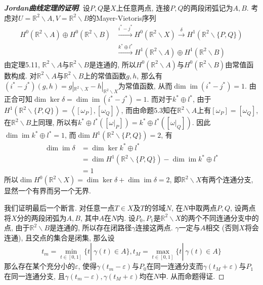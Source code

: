 \documentclass[11pt]{article}
\theoremstyle{definition}\newtheorem*{analyse}{分析}
\theoremstyle{remark}\newtheorem{rem*}{评注}
\DeclareMathOperator{\im}{im}
\begin{document}
\begin{proof}[{\bf Jordan曲线定理的证明}]
    设$P,Q$是$X$上任意两点, 连接$P,Q$的两段闭弧记为$A,B$.
    考虑对$U=\mathbb{R}^2\backslash A,V=\mathbb{R}^2\backslash B$的Mayer-Vietoris序列
    \begin{align*}
        H^0(\mathbb{R}^2\backslash A)\oplus H^0(\mathbb{R}^2\backslash B)&\xrightarrow{i^*-j^*}H^0(\mathbb{R}^2\backslash X)\xrightarrow{\delta}H^1(\mathbb{R}^2\backslash\{P,Q\})\\
        &\xrightarrow{k^*\oplus l^*}H^1(\mathbb{R}^2\backslash A)\oplus H^1(\mathbb{R}^2\backslash B)
    \end{align*}
    由定理5.11, $\mathbb{R}^2\backslash A$与$\mathbb{R}^2\backslash B$是连通的, 所以$H^0(\mathbb{R}^2\backslash A)$与$H^0(\mathbb{R}^2\backslash B)$由常值函数构成.
    对$\mathbb{R}^2\backslash A$与$\mathbb{R}^2\backslash B$上的常值函数$g,h$, 那么有$(i^*-j^*)(g,h)=g|_{\mathbb{R}^2\backslash X}-h|_{\mathbb{R}^2\backslash X}$为常值函数, 从而$\dim\im(i^*-j^*)=1$.
    由正合可知$\dim\ker\delta=\dim\im(i^*-j^*)=1$.
    而对于$k^*\oplus l^*$, 由于$H^1(\mathbb{R}^2\backslash\{P,Q\})=\left\langle[\omega_P],[\omega_Q]\right\rangle$, 而由命题5.3知在$\mathbb{R}^2\backslash A$上有$[\omega_P]=[\omega_Q]$, 在$\mathbb{R}^2\backslash B$上同理, 所以有$k^*\oplus l^*([\omega|_P])=k^*\oplus l^*([\omega|_Q])$.
    因此$\dim\im k^*\oplus l^*=1$, 而$\dim H^1(\mathbb{R}^2\backslash\{P,Q\})=2$, 有
    \begin{align*}
        \dim\im\delta&=\dim\ker k^*\oplus l^*\\
        &=\dim H^1(\mathbb{R}^2\backslash\{P,Q\})-\dim\im k^*\oplus l^*\\
        &=1
    \end{align*}
    所以$\dim H^0(\mathbb{R}^2\backslash X)=\dim\ker\delta+\dim\im\delta=2$, 即$\mathbb{R}^2\backslash X$有两个连通分支, 显然一个有界而另一个无界.

    我们证明最后一个断言.
    对任意一点$T\in X$及$T$的邻域$N$, 在$N$中取两点$P,Q$, 设两点将$X$分的两段闭弧为$A,B$, 其中$A$在$N$内.
    设$P_0,P_1$是$\mathbb{R}^2\backslash X$的两个不同连通分支中的点, 由于$\mathbb{R}^2\backslash B$是连通的, 所以存在闭路径$\gamma$连接这两点.
    $\gamma$一定与$A$相交 (否则$X$将会连通), 且交点的集合是闭集, 那么设
    \[t_m=\min_{t\in[0,1]}\{t|\ \gamma(t)\in A\},t_M=\max_{t\in[0,1]}\{t|\ \gamma(t)\in A\}\]
    那么存在某个充分小的$\varepsilon$, 使得$\gamma(t_m-\varepsilon)$与$P_0$在同一连通分支而$\gamma(t_M+\varepsilon)$与$P_1$在同一连通分支, 且$\gamma(t_m-\varepsilon),\gamma(t_M+\varepsilon)$均在$N$中.
    从而命题得证.
\end{proof}
\end{document}
